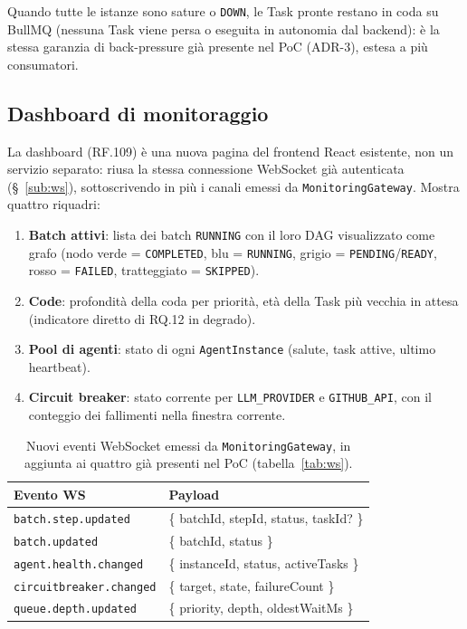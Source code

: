 \documentclass[11pt,a4paper]{article}
\begin{document}
Quando tutte le istanze sono sature o \texttt{DOWN}, le Task pronte restano in coda su BullMQ (nessuna Task viene persa o eseguita in autonomia dal backend): è la stessa garanzia di back-pressure già presente nel PoC (ADR-3), estesa a più consumatori.

\subsection{Dashboard di monitoraggio}

La dashboard (RF.109) è una nuova pagina del frontend React esistente, non un servizio separato: riusa la stessa connessione WebSocket già autenticata (\S~\ref{sub:ws}), sottoscrivendo in più i canali emessi da \texttt{MonitoringGateway}. Mostra quattro riquadri:

\begin{enumerate}
    \item \textbf{Batch attivi}: lista dei batch \texttt{RUNNING} con il loro DAG visualizzato come grafo (nodo verde = \texttt{COMPLETED}, blu = \texttt{RUNNING}, grigio = \texttt{PENDING}/\texttt{READY}, rosso = \texttt{FAILED}, tratteggiato = \texttt{SKIPPED}).
    \item \textbf{Code}: profondità della coda per priorità, età della Task più vecchia in attesa (indicatore diretto di RQ.12 in degrado).
    \item \textbf{Pool di agenti}: stato di ogni \texttt{AgentInstance} (salute, task attive, ultimo heartbeat).
    \item \textbf{Circuit breaker}: stato corrente per \texttt{LLM\_PROVIDER} e \texttt{GITHUB\_API}, con il conteggio dei fallimenti nella finestra corrente.
\end{enumerate}

\begin{table}[H]
\centering
\caption{Nuovi eventi WebSocket emessi da \texttt{MonitoringGateway}, in aggiunta ai quattro già presenti nel PoC (tabella~\ref{tab:ws}).}
\label{tab:orch-eventi-ws}
\vspace{2mm}
\renewcommand{\arraystretch}{1.3}
\begin{tabularx}{\textwidth}{|l|X|}
\hline
\textbf{Evento WS} & \textbf{Payload} \\ \hline
\texttt{batch.step.updated} & \{ batchId, stepId, status, taskId? \} \\ \hline
\texttt{batch.updated} & \{ batchId, status \} \\ \hline
\texttt{agent.health.changed} & \{ instanceId, status, activeTasks \} \\ \hline
\texttt{circuitbreaker.changed} & \{ target, state, failureCount \} \\ \hline
\texttt{queue.depth.updated} & \{ priority, depth, oldestWaitMs \} \\ \hline
\end{tabularx}
\end{table}
\end{document}
